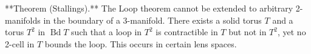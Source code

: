 **Theorem (Stallings).** The Loop theorem cannot be extended to arbitrary 2-manifolds in the boundary of a 3-manifold. There exists a solid torus $T$ and a torus $T^2$ in $\operatorname{Bd} T$ such that a loop in $T^2$ is contractible in $T$ but not in $T^2$, yet no 2-cell in $T$ bounds the loop. This occurs in certain lens spaces.
